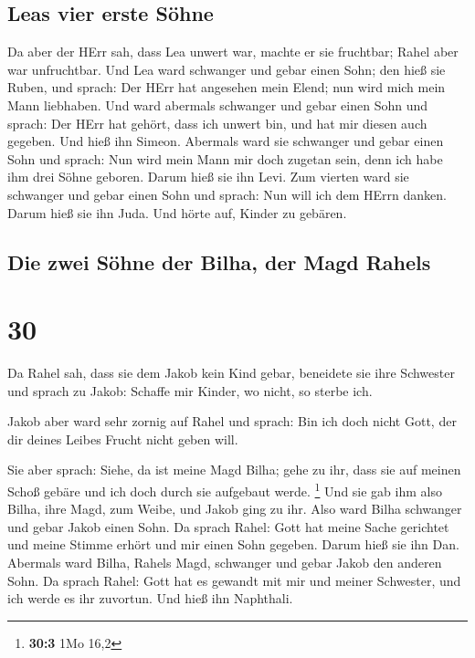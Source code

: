 \hypertarget{leas-vier-erste-suxf6hne}{%
\subsection{Leas vier erste Söhne}\label{leas-vier-erste-suxf6hne}}

 Da aber der HErr sah, dass Lea unwert war, machte er sie
fruchtbar; Rahel aber war unfruchtbar.  Und Lea ward
schwanger und gebar einen Sohn; den hieß sie Ruben, und sprach: Der HErr
hat angesehen mein Elend; nun wird mich mein Mann liebhaben.
 Und ward abermals schwanger und gebar einen Sohn und
sprach: Der HErr hat gehört, dass ich unwert bin, und hat mir diesen
auch gegeben. Und hieß ihn Simeon.  Abermals ward sie
schwanger und gebar einen Sohn und sprach: Nun wird mein Mann mir doch
zugetan sein, denn ich habe ihm drei Söhne geboren. Darum hieß sie ihn
Levi.  Zum vierten ward sie schwanger und gebar einen
Sohn und sprach: Nun will ich dem HErrn danken. Darum hieß sie ihn Juda.
Und hörte auf, Kinder zu gebären.

\hypertarget{die-zwei-suxf6hne-der-bilha-der-magd-rahels}{%
\subsection{Die zwei Söhne der Bilha, der Magd
Rahels}\label{die-zwei-suxf6hne-der-bilha-der-magd-rahels}}

\hypertarget{section-29}{%
\section{30}\label{section-29}}

 Da Rahel sah, dass sie dem Jakob kein Kind gebar,
beneidete sie ihre Schwester und sprach zu Jakob: Schaffe mir Kinder, wo
nicht, so sterbe ich.

 Jakob aber ward sehr zornig auf Rahel und sprach: Bin ich
doch nicht Gott, der dir deines Leibes Frucht nicht geben will.

 Sie aber sprach: Siehe, da ist meine Magd Bilha; gehe zu
ihr, dass sie auf meinen Schoß gebäre und ich doch durch sie aufgebaut
werde. \footnote{\textbf{30:3} 1Mo 16,2}  Und sie gab ihm
also Bilha, ihre Magd, zum Weibe, und Jakob ging zu ihr. 
Also ward Bilha schwanger und gebar Jakob einen Sohn.  Da
sprach Rahel: Gott hat meine Sache gerichtet und meine Stimme erhört und
mir einen Sohn gegeben. Darum hieß sie ihn Dan.  Abermals
ward Bilha, Rahels Magd, schwanger und gebar Jakob den anderen Sohn.
 Da sprach Rahel: Gott hat es gewandt mit mir und meiner
Schwester, und ich werde es ihr zuvortun. Und hieß ihn Naphthali.

